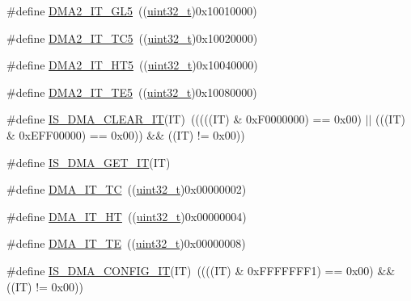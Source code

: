 \begin{DoxyCompactItemize}
\item 
\#define \hyperlink{group___d_m_a__interrupts__definition_ga2205d7e002767d98f7aa206634374082}{D\+M\+A2\+\_\+\+I\+T\+\_\+\+G\+L5}~((\hyperlink{_p_e___types_8h_a33594304e786b158f3fb30289278f5af}{uint32\+\_\+t})0x10010000)
\item 
\#define \hyperlink{group___d_m_a__interrupts__definition_gaa1134531a0aeb8daeb516985562129b0}{D\+M\+A2\+\_\+\+I\+T\+\_\+\+T\+C5}~((\hyperlink{_p_e___types_8h_a33594304e786b158f3fb30289278f5af}{uint32\+\_\+t})0x10020000)
\item 
\#define \hyperlink{group___d_m_a__interrupts__definition_ga4c1e0d1572267c1d48d787009148e3ef}{D\+M\+A2\+\_\+\+I\+T\+\_\+\+H\+T5}~((\hyperlink{_p_e___types_8h_a33594304e786b158f3fb30289278f5af}{uint32\+\_\+t})0x10040000)
\item 
\#define \hyperlink{group___d_m_a__interrupts__definition_gad47115e9a4d0d3f5d9101097983b5525}{D\+M\+A2\+\_\+\+I\+T\+\_\+\+T\+E5}~((\hyperlink{_p_e___types_8h_a33594304e786b158f3fb30289278f5af}{uint32\+\_\+t})0x10080000)
\item 
\#define \hyperlink{group___d_m_a__interrupts__definition_ga390481b083355ed774b04f70a42f0dfb}{I\+S\+\_\+\+D\+M\+A\+\_\+\+C\+L\+E\+A\+R\+\_\+\+IT}(IT)~(((((IT) \& 0x\+F0000000) == 0x00) $\vert$$\vert$ (((\+I\+T) \& 0x\+E\+F\+F00000) == 0x00)) \&\& ((\+I\+T) != 0x00))
\item 
\#define \hyperlink{group___d_m_a__interrupts__definition_gaaafa1bd74bc5e78e276c731faa8eed22}{I\+S\+\_\+\+D\+M\+A\+\_\+\+G\+E\+T\+\_\+\+IT}(IT)
\item 
\#define \hyperlink{group___d_m_a__interrupts__definition_ga06e83dd277e0d3e5635cf8ce8dfd6e16}{D\+M\+A\+\_\+\+I\+T\+\_\+\+TC}~((\hyperlink{_p_e___types_8h_a33594304e786b158f3fb30289278f5af}{uint32\+\_\+t})0x00000002)
\item 
\#define \hyperlink{group___d_m_a__interrupts__definition_gadf11c572b9797e04a14b105fdc2e5f66}{D\+M\+A\+\_\+\+I\+T\+\_\+\+HT}~((\hyperlink{_p_e___types_8h_a33594304e786b158f3fb30289278f5af}{uint32\+\_\+t})0x00000004)
\item 
\#define \hyperlink{group___d_m_a__interrupts__definition_gaf9d92649d2a0146f663ff253d8f3b59e}{D\+M\+A\+\_\+\+I\+T\+\_\+\+TE}~((\hyperlink{_p_e___types_8h_a33594304e786b158f3fb30289278f5af}{uint32\+\_\+t})0x00000008)
\item 
\#define \hyperlink{group___d_m_a__interrupts__definition_ga47f6af7da302c19aba24516037d305e7}{I\+S\+\_\+\+D\+M\+A\+\_\+\+C\+O\+N\+F\+I\+G\+\_\+\+IT}(IT)~((((IT) \& 0x\+F\+F\+F\+F\+F\+F\+F1) == 0x00) \&\& ((\+I\+T) != 0x00))
$$
\end{DoxyCompactItemize}
